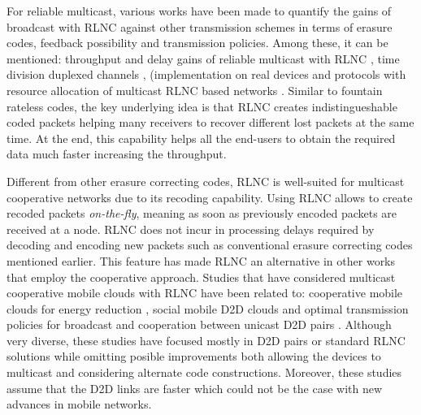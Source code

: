 For reliable multicast, various works have been made to quantify the gains of broadcast with \ac{RLNC} against other transmission schemes in terms of erasure codes, feedback possibility and transmission policies. Among these, it can be mentioned: throughput and delay gains of reliable multicast with \ac{RLNC} \cite{eryilmaz2008delay}, time division duplexed channels \cite{lucani2009random,lucani2009queue}, (implementation on real devices \cite{heide2009network} and protocols with resource allocation of multicast \ac{RLNC} based networks \cite{vukobratovic2014random,chiti2013optimized,tassi2015resource}. Similar to fountain rateless codes, the key underlying idea is that \ac{RLNC} creates indistingueshable coded packets helping many receivers to recover different lost packets at the same time. At the end, this capability helps all the end-users to obtain the required data much faster increasing the throughput.

Different from other erasure correcting codes, \ac{RLNC} is well-suited for multicast cooperative networks due to its recoding capability. Using \ac{RLNC} allows to create recoded packets \textit{on-the-fly}, meaning as soon as previously encoded packets are received at a node. \ac{RLNC} does not incur in processing delays required by decoding and encoding new packets such as conventional erasure correcting codes mentioned earlier. This feature has made \ac{RLNC} an alternative in other works that employ the cooperative approach. Studies that have considered multicast cooperative mobile clouds with \ac{RLNC} have been related to: cooperative mobile clouds for energy reduction \cite{heide2012green}, social mobile \ac{D2D} clouds \cite{fitzek2013implementation} and optimal transmission policies for broadcast and cooperation between unicast \ac{D2D} pairs \cite{khamfroush2013minimizing,khamfroush2015optimal}. Although very diverse, these studies have focused mostly in \ac{D2D} pairs or standard \ac{RLNC} solutions while omitting posible improvements both allowing the devices to multicast and considering alternate code constructions. Moreover, these studies assume that the \ac{D2D} links are faster which could not be the case with new advances in mobile networks.

\clearpage
